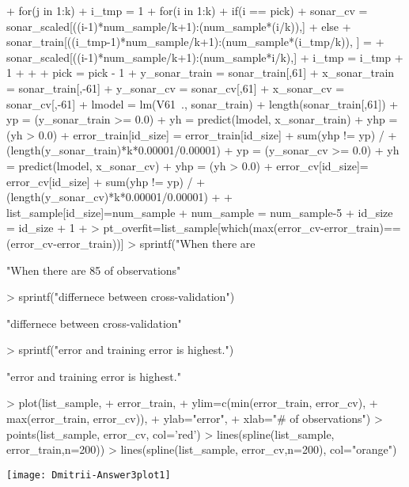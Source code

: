 \documentclass{article}
\begin{document}
\begin{Schunk}
\begin{Sinput}
{+ for(j in 1:k){
+ i_tmp = 1
+ for(i in 1:k){
+ if(i == pick){
+ sonar_cv = sonar_scaled[((i-1)*num_sample/k+1):(num_sample*(i/k)),]
+ } else {
+ sonar_train[((i_tmp-1)*num_sample/k+1):(num_sample*(i_tmp/k)), ] = 
+   sonar_scaled[((i-1)*num_sample/k+1):(num_sample*i/k),]
+ i_tmp = i_tmp + 1
+   }
+     }
+ pick = pick - 1
+ y_sonar_train = sonar_train[,61]
+ x_sonar_train = sonar_train[,-61]
+ y_sonar_cv = sonar_cv[,61]
+ x_sonar_cv = sonar_cv[,-61]
+ lmodel = lm(V61~., sonar_train)
+ length(sonar_train[,61])
+ yp = (y_sonar_train >= 0.0)
+ yh = predict(lmodel, x_sonar_train)
+ yhp = (yh > 0.0)
+ error_train[id_size] = error_train[id_size] + sum(yhp != yp) /
+                        (length(y_sonar_train)*k*0.00001/0.00001)
+ yp = (y_sonar_cv >= 0.0)
+ yh = predict(lmodel, x_sonar_cv)
+ yhp = (yh > 0.0)
+ error_cv[id_size]= error_cv[id_size] + sum(yhp != yp) / 
+                     (length(y_sonar_cv)*k*0.00001/0.00001)
+       }
+ list_sample[id_size]=num_sample
+ num_sample = num_sample-5
+ id_size = id_size + 1  
+ }
> pt_overfit=list_sample[which(max(error_cv-error_train)==(error_cv-error_train))]
> sprintf("When there are %d of observations",pt_overfit)
\end{Sinput}
\begin{Soutput}
[1] "When there are 85 of observations"
\end{Soutput}
\begin{Sinput}
> sprintf("differnece between cross-validation")
\end{Sinput}
\begin{Soutput}
[1] "differnece between cross-validation"
\end{Soutput}
\begin{Sinput}
> sprintf("error and training error is highest.")
\end{Sinput}
\begin{Soutput}
[1] "error and training error is highest."
\end{Soutput}
\end{Schunk}
\begin{Schunk}
\begin{Sinput}
> plot(list_sample, 
+      error_train,
+      ylim=c(min(error_train, error_cv), 
+             max(error_train, error_cv)),
+      ylab="error", 
+      xlab="# of observations")
> points(list_sample, error_cv, col='red')
> lines(spline(list_sample, error_train,n=200))
> lines(spline(list_sample, error_cv,n=200), col="orange")
\end{Sinput}
\end{Schunk}
\texttt{[image: Dmitrii-Answer3plot1]}
\end{document}
